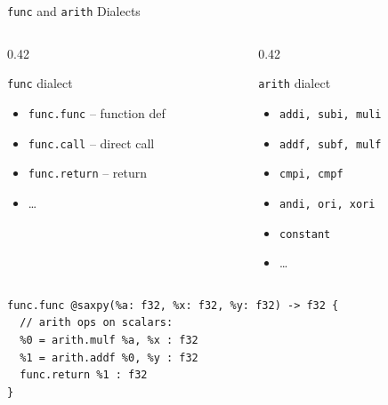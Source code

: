 \begin{frame}[fragile]{\texttt{func} and \texttt{arith} Dialects}
  \begin{columns}
    \begin{column}{0.42\textwidth}
      \begin{block}{\texttt{func} dialect}
        {\small
        \begin{itemize}
          \item \texttt{func.func} -- function def
          \item \texttt{func.call} -- direct call
          \item \texttt{func.return} -- return
          \item \ldots
        \end{itemize}
        }
      \end{block}
    \end{column}
    \begin{column}{0.42\textwidth}
      \begin{exampleblock}{\texttt{arith} dialect}
        {\small
        \begin{itemize}
          \item \texttt{addi, subi, muli}
          \item \texttt{addf, subf, mulf}
          \item \texttt{cmpi, cmpf}
          \item \texttt{andi, ori, xori}
          \item \texttt{constant}
          \item \ldots
        \end{itemize}
        }
      \end{exampleblock}
    \end{column}
  \end{columns}

  \bigskip
\begin{lstlisting}[language=none,basicstyle=\ttfamily\small]
func.func @saxpy(%a: f32, %x: f32, %y: f32) -> f32 {
  // arith ops on scalars:
  %0 = arith.mulf %a, %x : f32
  %1 = arith.addf %0, %y : f32
  func.return %1 : f32
}
\end{lstlisting}
\end{frame}


